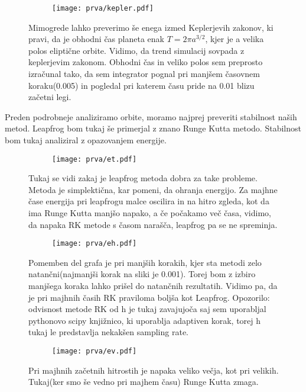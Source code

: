 \documentclass{article}
\begin{document}
\begin{figure}[H]
\centering
\begin{subfigure}{.7\textwidth}
\texttt{[image: prva/kepler.pdf]}
\end{subfigure}
\caption*{Mimogrede lahko preverimo še enega izmed Keplerjevih zakonov, ki pravi, da je obhodni čas planeta enak $T=2 \pi a^{3/2}$, kjer je a velika polos eliptične orbite. Vidimo, da trend simulacij sovpada z keplerjevim zakonom. Obhodni čas in veliko polos sem preprosto izračunal tako, da sem integrator pognal pri manjšem časovnem koraku(0.005) in pogledal pri katerem času pride na 0.01 blizu začetni legi.}
\end{figure}

Preden podrobneje analiziramo orbite, moramo najprej preveriti stabilnost naših metod. Leapfrog bom tukaj še primerjal z znano Runge Kutta metodo. Stabilnost bom tukaj analiziral z opazovanjem energije.

\begin{figure}[H]
\centering
\begin{subfigure}{.7\textwidth}
\texttt{[image: prva/et.pdf]}
\end{subfigure}
\caption*{Tukaj se vidi zakaj je leapfrog metoda dobra za take probleme. Metoda je simplektična, kar pomeni, da ohranja energijo. Za majhne čase energija pri leapfrogu malce oscilira in na hitro zgleda, kot da ima Runge Kutta manjšo napako, a če počakamo več časa, vidimo, da napaka RK metode s časom narašča, leapfrog pa se ne spreminja.}
\end{figure}

\begin{figure}[H]
\centering
\begin{subfigure}{.7\textwidth}
\texttt{[image: prva/eh.pdf]}
\end{subfigure}
\caption*{Pomemben del grafa je pri manjših korakih, kjer sta metodi zelo natančni(najmanjši korak na sliki je 0.001). Torej bom z izbiro manjšega koraka lahko prišel do natančnih rezultatih. Vidimo pa, da je pri majhnih časih RK praviloma boljša kot Leapfrog. Opozorilo: odvisnost metode RK od h je tukaj zavajujoča saj sem uporabljal pythonovo scipy knjižnico, ki uporablja adaptiven korak, torej h tukaj le predstavlja nekakšen sampling rate.}
\end{figure}

\begin{figure}[H]
\centering
\begin{subfigure}{.7\textwidth}
\texttt{[image: prva/ev.pdf]}
\end{subfigure}
\caption*{Pri majhnih začetnih hitrostih je napaka veliko večja, kot pri velikih. Tukaj(ker smo še vedno pri majhem času) Runge Kutta zmaga.}
\end{figure}
\end{document}
